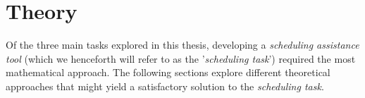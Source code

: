 \section{Theory}\label{sec:theory}
Of the three main tasks explored in this thesis, developing a \emph{scheduling assistance tool} (which we henceforth will refer to as the '\emph{scheduling task}') required the most mathematical approach. 
The following sections explore different theoretical approaches that might yield a satisfactory solution to the \emph{scheduling task}.





